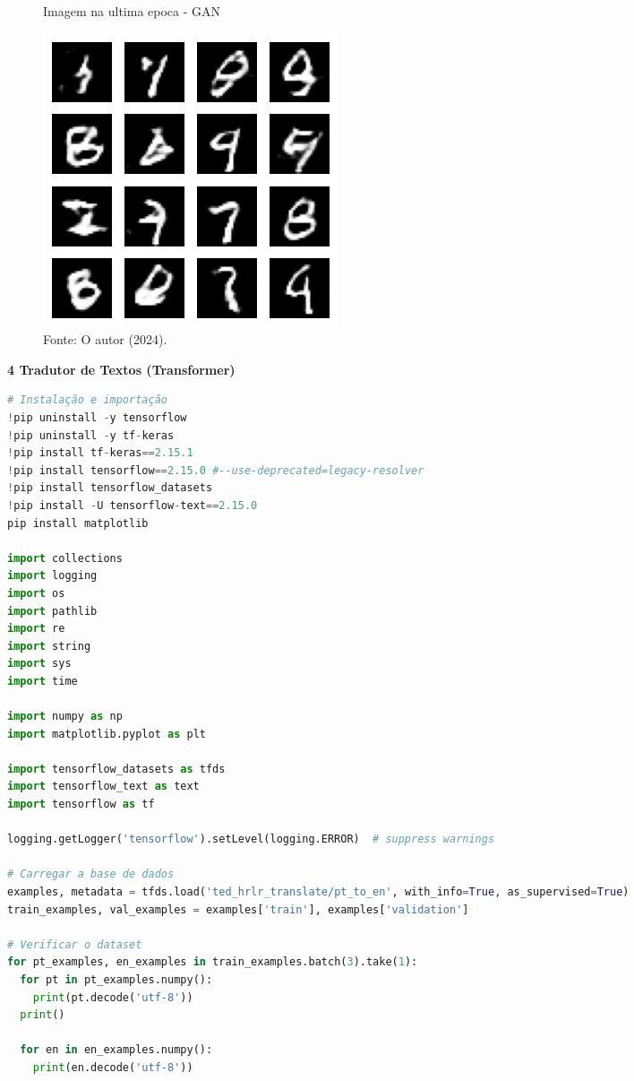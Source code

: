 \begin{figure}[H]
\centering
\caption{Imagem na ultima epoca - GAN}
\includegraphics[width=.6\linewidth]{apendices/fig/9_IAA009_8.png}
\caption*{Fonte: O autor (2024).}
\end{figure}

\begin{adjustwidth}{1em}{}
\textbf{4 Tradutor de Textos (Transformer)}
\end{adjustwidth}


\begin{lstlisting}[language=Python, style=input]
# Instalação e importação
!pip uninstall -y tensorflow
!pip uninstall -y tf-keras
!pip install tf-keras==2.15.1
!pip install tensorflow==2.15.0 #--use-deprecated=legacy-resolver
!pip install tensorflow_datasets
!pip install -U tensorflow-text==2.15.0
pip install matplotlib

import collections
import logging
import os
import pathlib
import re
import string
import sys
import time

import numpy as np
import matplotlib.pyplot as plt

import tensorflow_datasets as tfds
import tensorflow_text as text
import tensorflow as tf

logging.getLogger('tensorflow').setLevel(logging.ERROR)  # suppress warnings

# Carregar a base de dados
examples, metadata = tfds.load('ted_hrlr_translate/pt_to_en', with_info=True, as_supervised=True)
train_examples, val_examples = examples['train'], examples['validation']

# Verificar o dataset
for pt_examples, en_examples in train_examples.batch(3).take(1):
  for pt in pt_examples.numpy():
    print(pt.decode('utf-8'))
  print()

  for en in en_examples.numpy():
    print(en.decode('utf-8'))
\end{lstlisting}

